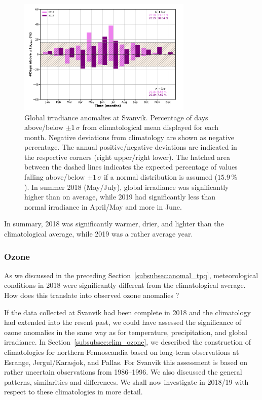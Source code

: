 \documentclass[bg, manuscript]{copernicus}
\begin{document}
\begin{figure}[t]
  \includegraphics[width=8.3cm]{fig10}
  \caption{Global irradiance anomalies at Svanvik. Percentage of days above/below $\pm 1\,\sigma$ from climatological mean displayed for each month. Negative deviations from climatology are shown as negative percentage. The annual positive/negative deviations are indicated in the respective corners (right upper/right lower). The hatched area between the dashed lines indicates the expected percentage of values falling above/below $\pm 1\,\sigma$ if a normal distribution is assumed ($15.9\,\unit{\%}$). In summer 2018 (May/July), global irradiance was significantly higher than on average, while 2019 had significantly less than normal irradiance in April/May and more in June.}
  \label{fig:global_rad_signific}
\end{figure}

In summary, 2018 was significantly warmer, drier, and lighter than the climatological average, while 2019 was a rather average year.

\subsubsection{Ozone}
\label{subsubsec:anomal_ozone}
As we discussed in the preceding Section~\ref{subsubsec:anomal_tpq}, meteorological conditions in 2018 were significantly different from the climatological average. How does this translate into observed ozone anomalies \chem{\Delta[O_3]}?

If the data collected at Svanvik had been complete in 2018 and the climatology had extended into the resent past, we could have assessed the significance of ozone anomalies in the same way as for temperature, precipitation, and global irradiance. In Section~\ref{subsubsec:clim_ozone}, we described the construction of climatologies for northern Fennoscandia based on long-term observations at Esrange, Jergul/Karasjok, and Pallas. For Svanvik this assessment is based on rather uncertain observations from 1986--1996. We also discussed the general patterns, similarities and differences. We shall now investigate \chem{\Delta[O_3]} in 2018/19 with respect to these climatologies in more detail.
\end{document}
